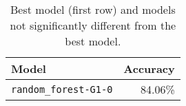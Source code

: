\begin{table}[H]
\centering
\begin{tabularx}{0.48\textwidth}{|X|r|}
\hline
Model & Accuracy \\
\hline
\texttt{random\_forest-G1-0} & 84.06\% \\
\hline
\end{tabularx}
\caption{Best model (first row) and models not significantly different from the best model.}
\label{tab:best_models}

\end{table}
